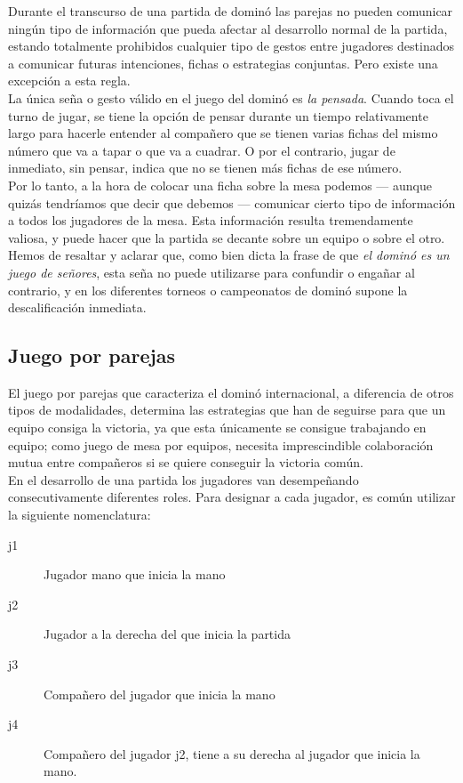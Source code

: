 Durante el transcurso de una partida de dominó las parejas no pueden comunicar ningún tipo de información
que pueda afectar al desarrollo normal de la partida, estando totalmente prohibidos cualquier tipo de gestos
entre jugadores destinados a comunicar futuras intenciones, fichas o estrategias conjuntas. Pero existe
una excepción a esta regla. \\

La única seña o gesto válido en el juego del dominó es \emph{la pensada}. Cuando toca el turno de jugar, se tiene la
opción de pensar durante un tiempo relativamente largo para hacerle entender al compañero que se tienen
varias fichas del mismo número que va a tapar o que va a cuadrar. O por el contrario, jugar de inmediato,
sin pensar, indica que no se tienen más fichas de ese número. \\

Por lo tanto, a la hora de colocar una ficha sobre la mesa podemos --- aunque quizás tendríamos que decir que 
debemos --- comunicar cierto tipo de información a todos los jugadores de la mesa. Esta información resulta
tremendamente valiosa, y puede hacer que la partida se decante sobre un equipo o sobre el otro. \\

Hemos de resaltar y aclarar que, como bien dicta la frase de que \emph{el dominó es un juego de señores},
esta seña no puede utilizarse para confundir o engañar al contrario, y en los diferentes torneos o campeonatos
de dominó supone la descalificación inmediata.


\subsection{Juego por parejas}
\label{juegoporparejas}

El juego por parejas que caracteriza el dominó internacional, a diferencia de otros tipos de modalidades,
determina las estrategias que han de seguirse para que un equipo consiga la victoria, ya que esta únicamente
se consigue trabajando en equipo; como juego de mesa por equipos, necesita imprescindible colaboración
mutua entre compañeros si se quiere conseguir la victoria común. \\

En el desarrollo de una partida los jugadores van desempeñando consecutivamente diferentes roles. Para designar
a cada jugador, es común utilizar la siguiente nomenclatura: 

\begin{description}
    \item[j1] Jugador mano que inicia la mano
    \item[j2] Jugador a la derecha del que inicia la partida
    \item[j3] Compañero del jugador que inicia la mano
    \item[j4] Compañero del jugador j2, tiene a su derecha al jugador que inicia la mano.
\end{description}

